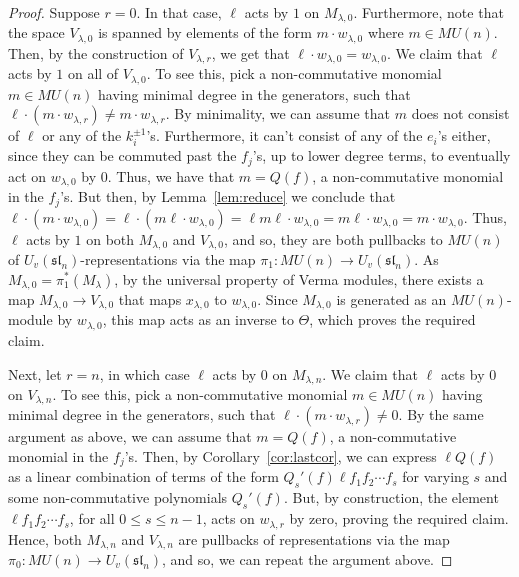 \documentclass{amsart}
\numberwithin{equation}{section}
\theoremstyle{theorem}
\theoremstyle{definition}
\newcommand{\sll}{\mathfrak{sl}}
\newcommand{\uvsln}{U_v(\sll_n)}
\begin{document}
\begin{proof}
Suppose $r=0$. In that case, $\ell$ acts by $1$ on $M_{\lambda, 0}$. Furthermore, note that the space $V_{\lambda,0}$ is spanned by elements of the form $m\cdot  w_{\lambda, 0}$ where $m\in MU(n)$. Then, by the construction of $V_{\lambda,r}$, we get that $\ell\cdot w_{\lambda, 0}= w_{\lambda,0}$. We claim that $\ell$ acts by $1$ on all of $V_{\lambda, 0}$. To see this, pick a non-commutative monomial $m\in MU(n)$ having minimal degree in the generators, such that $\ell\cdot (m\cdot w_{\lambda, r})\neq m\cdot w_{\lambda, r}$. By minimality, we can assume that $m$ does not consist of $\ell$ or any of the $k_i^{\pm1}$'s. Furthermore, it can't consist of any of the $e_i$'s either, since they can be commuted past the $f_j$'s, up to lower degree terms, to eventually act on $w_{\lambda, 0}$ by $0$. Thus, we have that $m=Q(f)$, a non-commutative monomial in the $f_j$'s. But then, by Lemma~\ref{lem:reduce} we conclude that $\ell\cdot(m\cdot w_{\lambda, 0})= \ell \cdot(m\ell\cdot w_{\lambda, 0}) = \ell m\ell \cdot w_{\lambda, 0} = m\ell\cdot w_{\lambda, 0} =m\cdot w_{\lambda, 0}$. Thus, $\ell$ acts by $1$ on both $M_{\lambda,0}$ and $V_{\lambda, 0}$, and so, they are both pullbacks to $MU(n)$ of $\uvsln$-representations via the map $\pi_1:MU(n)\to \uvsln$. As $M_{\lambda, 0}=\pi_1^*(M_{\lambda})$, by the universal property of Verma modules, there exists a map $M_{\lambda, 0}\to V_{\lambda, 0}$ that maps $x_{\lambda, 0}$ to $w_{\lambda, 0}$. Since $M_{\lambda, 0}$ is generated as an $MU(n)$-module by $w_{\lambda, 0}$, this map acts as an inverse to $\Theta$, which proves the required claim.%

Next, let $r=n$, in which case $\ell$ acts by $0$ on $M_{\lambda, n}$. %
We claim that $\ell$ acts by $0$ on $V_{\lambda, n}$. To see this, pick a non-commutative monomial $m\in MU(n)$ having minimal degree in the generators, such that $\ell\cdot (m\cdot w_{\lambda, r})\neq 0$. By the same argument as above, we can assume that $m=Q(f)$, a non-commutative monomial in the $f_j$'s. Then, by Corollary~\ref{cor:lastcor}, we can express $\ell Q(f)$ as a linear combination of terms of the form $Q_s'(f) \ell f_1f_2\cdots f_s$ for varying $s$ and some non-commutative polynomials $Q_s'(f)$. But, by construction, the element $\ell f_1f_2\cdots f_s$, for all $0\leq s\leq n-1$, acts on $w_{\lambda, r}$ by zero, proving the required claim. Hence, both $M_{\lambda, n}$ and $V_{\lambda, n}$ are pullbacks of representations via the map $\pi_0: MU(n)\to \uvsln$, and so, we can repeat the argument above.
\end{proof}
\end{document}
